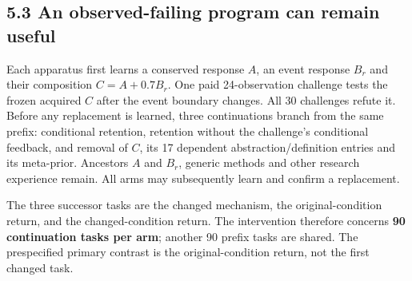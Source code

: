 \documentclass[twoside,11pt]{article}
\begin{document}
\subsection*{5.3 An observed-failing program can remain useful}

Each apparatus first learns a conserved response \(A\), an event response \(B_r\) and their composition \(C=A+0.7B_r\). One paid 24-observation challenge tests the frozen acquired \(C\) after the event boundary changes. All 30 challenges refute it. Before any replacement is learned, three continuations branch from the same prefix: conditional retention, retention without the challenge's conditional feedback, and removal of \(C\), its 17 dependent abstraction/definition entries and its meta-prior. Ancestors \(A\) and \(B_r\), generic methods and other research experience remain. All arms may subsequently learn and confirm a replacement.


The three successor tasks are the changed mechanism, the original-condition return, and the changed-condition return. The intervention therefore concerns \textbf{90 continuation tasks per arm}; another 90 prefix tasks are shared. The prespecified primary contrast is the original-condition return, not the first changed task.
\end{document}
